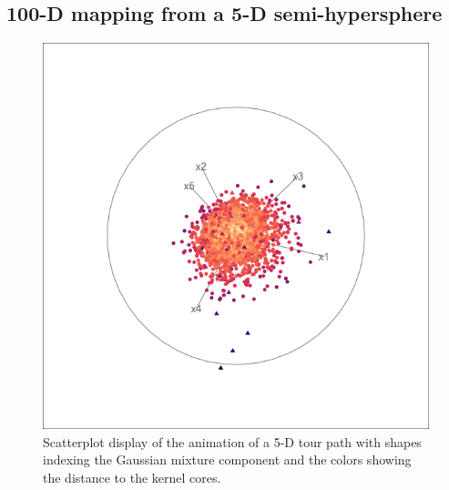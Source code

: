 \documentclass[11pt,a4paper,]{article}
\begin{document}
\hypertarget{fivedgaussian}{%
\subsection{100-D mapping from a 5-D semi-hypersphere}\label{fivedgaussian}}

\begin{figure}

{\centering \includegraphics[width=0.7\linewidth]{figures/tourr_5d_semisphere} 

}

\caption{Scatterplot display of the animation of a 5-D tour path with shapes indexing the Gaussian mixture component and the colors showing the distance to the kernel cores.}\label{fig:fivedmeta}
\end{figure}
\end{document}
